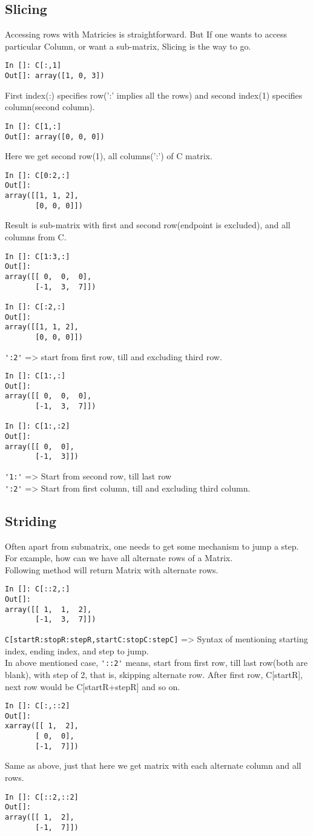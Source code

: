 \documentclass[12pt]{article}
\newcommand{\typ}[1]{\lstinline{#1}}
\begin{document}
\subsection{Slicing}
Accessing rows with Matricies is straightforward. But If one wants to access particular Column, or want a sub-matrix, Slicing is the way to go.
\begin{lstlisting}
In []: C[:,1]
Out[]: array([1, 0, 3])
\end{lstlisting}
First index(:) specifies row(':' implies all the rows) and second index(1) specifies column(second column).
\begin{lstlisting}
In []: C[1,:]
Out[]: array([0, 0, 0])
\end{lstlisting}
Here we get second row(1), all columns(':') of C matrix.
\newpage
\begin{lstlisting}
In []: C[0:2,:]
Out[]: 
array([[1, 1, 2],
       [0, 0, 0]])
\end{lstlisting}
Result is sub-matrix with first and second row(endpoint is excluded), and all columns from C.
\begin{lstlisting}
In []: C[1:3,:]
Out[]: 
array([[ 0,  0,  0],
       [-1,  3,  7]])

In []: C[:2,:]
Out[]: 
array([[1, 1, 2],
       [0, 0, 0]])
\end{lstlisting}
\typ{':2'} => start from first row, till and excluding third row.
\begin{lstlisting}
In []: C[1:,:]
Out[]: 
array([[ 0,  0,  0],
       [-1,  3,  7]])

In []: C[1:,:2]
Out[]: 
array([[ 0,  0],
       [-1,  3]])
\end{lstlisting}
\typ{'1:'} => Start from second row, till last row\\
\typ{':2'} => Start from first column, till and excluding third column.
\subsection{Striding}
Often apart from submatrix, one needs to get some mechanism to jump a step. For example, how can we have all alternate rows of a Matrix. \\
Following method will return Matrix with alternate rows.
\begin{lstlisting}
In []: C[::2,:]
Out[]: 
array([[ 1,  1,  2],
       [-1,  3,  7]])
\end{lstlisting}
\typ{C[startR:stopR:stepR,startC:stopC:stepC]} => Syntax of mentioning starting index, ending index, and step to jump.\\
In above mentioned case, \typ{'::2'} means, start from first row, till last row(both are blank), with step of 2, that is, skipping alternate row. After first row, C[startR], next row would be C[startR+stepR] and so on.
\begin{lstlisting}
In []: C[:,::2]
Out[]: 
xarray([[ 1,  2],
       [ 0,  0],
       [-1,  7]])
\end{lstlisting}
Same as above, just that here we get matrix with each alternate column and all rows.
\begin{lstlisting}
In []: C[::2,::2]
Out[]: 
array([[ 1,  2],
       [-1,  7]])
\end{lstlisting}
\end{document}
